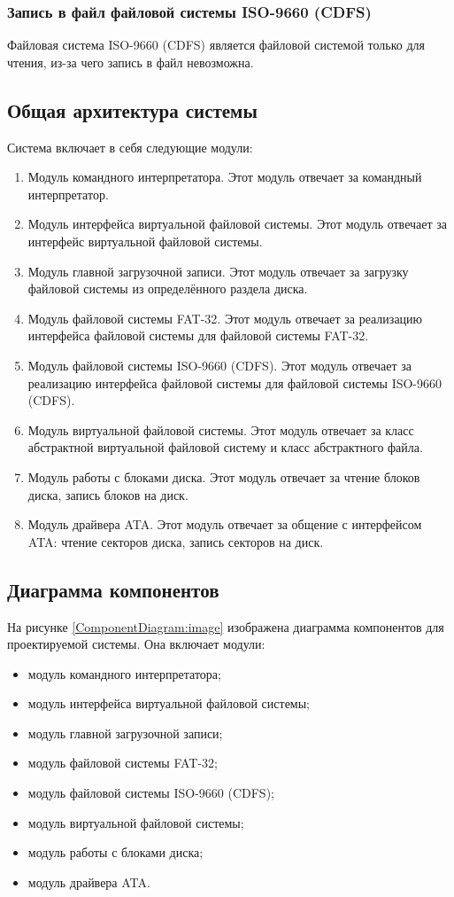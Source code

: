 \subsubsection{Запись в файл файловой системы ISO-9660 (CDFS)}

Файловая система ISO-9660 (CDFS) является файловой системой только для чтения, из-за чего запись в файл невозможна.

\subsection{Общая архитектура системы}

Система включает в себя следующие модули:

\begin{enumerate}
\item Модуль командного интерпретатора. Этот модуль отвечает за командный интерпретатор.
\item Модуль интерфейса виртуальной файловой системы. Этот модуль отвечает за интерфейс виртуальной файловой системы.
\item Модуль главной загрузочной записи. Этот модуль отвечает за загрузку файловой системы из определённого раздела диска.
\item Модуль файловой системы FAT-32. Этот модуль отвечает за реализацию интерфейса файловой системы для файловой системы FAT-32.
\item Модуль файловой системы ISO-9660 (CDFS). Этот модуль отвечает за реализацию интерфейса файловой системы для файловой системы ISO-9660 (CDFS).
\item Модуль виртуальной файловой системы. Этот модуль отвечает за класс абстрактной виртуальной файловой систему и класс абстрактного файла.
\item Модуль работы с блоками диска. Этот модуль отвечает за чтение блоков диска, запись блоков на диск.
\item Модуль драйвера ATA. Этот модуль отвечает за общение с интерфейсом ATA: чтение секторов диска, запись секторов на диск.
\end{enumerate}

\subsection{Диаграмма компонентов}

На рисунке \ref{ComponentDiagram:image} изображена диаграмма компонентов для проектируемой
системы. Она включает модули:

\begin{itemize}
\item модуль командного интерпретатора;
\item модуль интерфейса виртуальной файловой системы;
\item модуль главной загрузочной записи;
\item модуль файловой системы FAT-32;
\item модуль файловой системы ISO-9660 (CDFS);
\item модуль виртуальной файловой системы;
\item модуль работы с блоками диска;
\item модуль драйвера ATA.
\end{itemize}

